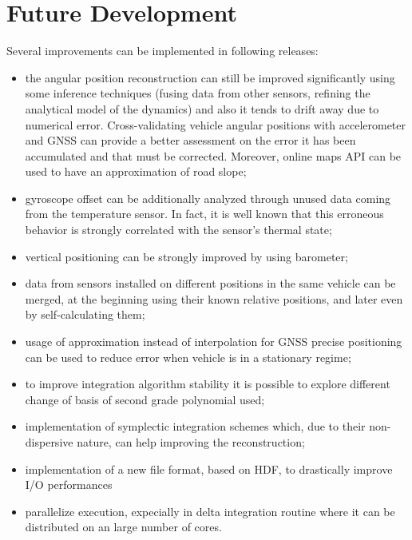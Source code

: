 \section{Future Development}
Several improvements can be implemented in following releases:
\begin{itemize}
\item the angular position reconstruction can still be improved significantly using some inference techniques (fusing data from other sensors, refining the analytical model of the dynamics) and also it tends to drift away due to numerical error. Cross-validating vehicle angular positions with accelerometer and GNSS can provide a better assessment on the error it has been accumulated and that must be corrected. Moreover, online maps API can be used to have an approximation of road slope;
\item gyroscope offset can be additionally analyzed through unused data coming from the temperature sensor. In fact, it is well known that this erroneous behavior is strongly correlated with the sensor's thermal state;
\item vertical positioning can be strongly improved by using barometer;
\item data from sensors installed on different positions in the same vehicle can be merged, at the beginning using their known relative positions, and later even by self-calculating them;
\item usage of approximation instead of interpolation for GNSS precise positioning can be used to reduce error when vehicle is in a stationary regime;
\item to improve integration algorithm stability it is possible to explore different change of basis of second grade polynomial used;
\item implementation of symplectic integration schemes which, due to their non-dispersive nature, can help improving the reconstruction;
\item implementation of a new file format, based on HDF, to drastically improve I/O performances
\item parallelize execution, expecially in delta integration routine where it can be distributed on an large number of cores.
\end{itemize}